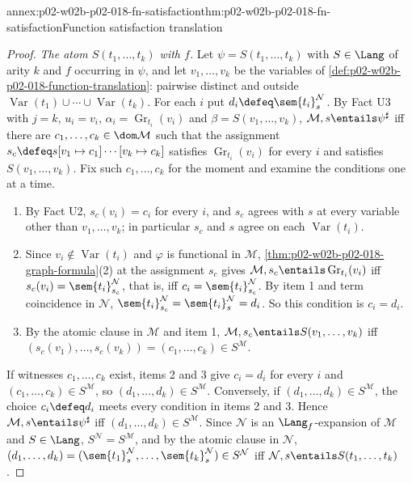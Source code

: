 \begin{annexitem}{annex:p02-w02b-p02-018-fn-satisfaction}{thm:p02-w02b-p02-018-fn-satisfaction}{Function satisfaction translation}
\begin{proof}
\emph{The atom \(S(t_1,\ldots,t_k)\) with \(f\).}  Let
\(\psi=S(t_1,\ldots,t_k)\) with \(S\in\Lang\) of arity \(k\) and \(f\)
occurring in \(\psi\), and let \(v_1,\ldots,v_k\) be the variables of
\cref{def:p02-w02b-p02-018-function-translation}: pairwise distinct and
outside \(\operatorname{Var}(t_1)\cup\cdots\cup\operatorname{Var}(t_k)\).
For each \(i\) put \(d_i\defeq\sem{t_i}^{\mathcal N}_s\).  By Fact U3 with
\(j=k\), \(u_i=v_i\), \(\alpha_i=\operatorname{Gr}_{t_i}(v_i)\) and
\(\beta=S(v_1,\ldots,v_k)\), \(\mathcal M,s\entails\psi^{\sharp}\) iff there
are \(c_1,\ldots,c_k\in\dom\mathcal M\) such that the assignment
\(s_c\defeq s[v_1\mapsto c_1]\cdots[v_k\mapsto c_k]\) satisfies
\(\operatorname{Gr}_{t_i}(v_i)\) for every \(i\) and satisfies
\(S(v_1,\ldots,v_k)\).  Fix such \(c_1,\ldots,c_k\) for the moment and
examine the conditions one at a time.
\begin{enumerate}
 \item By Fact U2, \(s_c(v_i)=c_i\) for every \(i\), and \(s_c\) agrees with
       \(s\) at every variable other than \(v_1,\ldots,v_k\); in particular
       \(s_c\) and \(s\) agree on each \(\operatorname{Var}(t_i)\).
 \item Since \(v_i\notin\operatorname{Var}(t_i)\) and \(\varphi\) is
       functional in \(\mathcal M\),
       \cref{thm:p02-w02b-p02-018-graph-formula}(2) at the assignment
       \(s_c\) gives \(\mathcal M,s_c\entails\operatorname{Gr}_{t_i}(v_i)\)
       iff \(s_c(v_i)=\sem{t_i}^{\mathcal N}_{s_c}\), that is, iff
       \(c_i=\sem{t_i}^{\mathcal N}_{s_c}\).  By item 1 and term coincidence
       in \(\mathcal N\), \(\sem{t_i}^{\mathcal N}_{s_c}=\sem{t_i}^{\mathcal N}_{s}=d_i\).
       So this condition is \(c_i=d_i\).
 \item By the atomic clause in \(\mathcal M\) and item 1,
       \(\mathcal M,s_c\entails S(v_1,\ldots,v_k)\) iff
       \((s_c(v_1),\ldots,s_c(v_k))=(c_1,\ldots,c_k)\in S^{\mathcal M}\).
\end{enumerate}
If witnesses \(c_1,\ldots,c_k\) exist, items 2 and 3 give \(c_i=d_i\) for
every \(i\) and \((c_1,\ldots,c_k)\in S^{\mathcal M}\), so
\((d_1,\ldots,d_k)\in S^{\mathcal M}\).  Conversely, if
\((d_1,\ldots,d_k)\in S^{\mathcal M}\), the choice \(c_i\defeq d_i\) meets
every condition in items 2 and 3.  Hence
\(\mathcal M,s\entails\psi^{\sharp}\) iff
\((d_1,\ldots,d_k)\in S^{\mathcal M}\).  Since \(\mathcal N\) is an
\(\Lang_f\)-expansion of \(\mathcal M\) and \(S\in\Lang\),
\(S^{\mathcal N}=S^{\mathcal M}\), and by the atomic clause in \(\mathcal N\),
\((d_1,\ldots,d_k)=(\sem{t_1}^{\mathcal N}_s,\ldots,\sem{t_k}^{\mathcal N}_s)
\in S^{\mathcal N}\) iff \(\mathcal N,s\entails S(t_1,\ldots,t_k)\).


\end{proof}
\end{annexitem}
